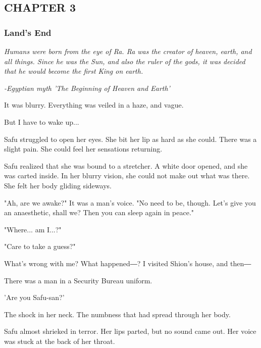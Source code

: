 \hypertarget{index_split_034.htmlux5cux23calibre_pb_66}{}

\protect\hypertarget{index_split_065.html}{}{}

\hypertarget{index_split_065.htmlux5cux23calibre_pb_0}{}

\hypertarget{index_split_065.htmlux5cux23calibre_toc_4}{%
\subsection{CHAPTER 3}\label{index_split_065.htmlux5cux23calibre_toc_4}}

\subsubsection{Land's End}

\emph{Humans were born from the eye of Ra. Ra was the creator of heaven,
earth, and all things. Since he was the Sun, and also the ruler of the
gods, it was decided that he would become the first King on earth.}

\emph{-Egyptian myth 'The Beginning of Heaven and Earth'~}

It was blurry. Everything was veiled in a haze, and vague.

But I have to wake up...

Safu struggled to open her eyes. She bit her lip as hard as she could.
There was a slight pain. She could feel her sensations returning.

Safu realized that she was bound to a stretcher. A white door opened,
and she was carted inside. In her blurry vision, she could not make out
what was there. She felt her body gliding sideways.

"Ah, are we awake?" It was a man's voice. "No need to be, though. Let's
give you an anaesthetic, shall we? Then you can sleep again in peace."

"Where... am I...?"

"Care to take a guess?"

What's wrong with me? What happened―? I visited Shion's house, and then―

There was a man in a Security Bureau uniform.

'Are you Safu-san?'

The shock in her neck. The numbness that had spread through her body.

Safu almost shrieked in terror. Her lips parted, but no sound came out.
Her voice was stuck at the back of her throat.

